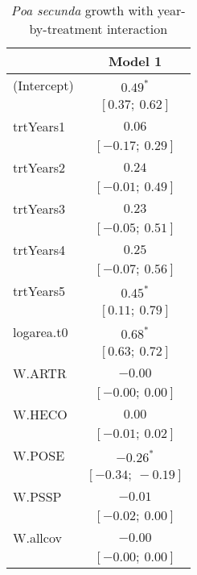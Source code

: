\documentclass[11pt]{article}
\begin{document}
\begin{table}
\caption{\textit{Poa secunda} growth with year-by-treatment interaction}
\begin{center}
\begin{tabular}{l c }
\hline
 & Model 1 \\
\hline
(Intercept)                      & $0.49^{*}$        \\
                                 & $[0.37;\ 0.62]$   \\
trtYears1                        & $0.06$            \\
                                 & $[-0.17;\ 0.29]$  \\
trtYears2                        & $0.24$            \\
                                 & $[-0.01;\ 0.49]$  \\
trtYears3                        & $0.23$            \\
                                 & $[-0.05;\ 0.51]$  \\
trtYears4                        & $0.25$            \\
                                 & $[-0.07;\ 0.56]$  \\
trtYears5                        & $0.45^{*}$        \\
                                 & $[0.11;\ 0.79]$   \\
logarea.t0                       & $0.68^{*}$        \\
                                 & $[0.63;\ 0.72]$   \\
W.ARTR                           & $-0.00$           \\
                                 & $[-0.00;\ 0.00]$  \\
W.HECO                           & $0.00$            \\
                                 & $[-0.01;\ 0.02]$  \\
W.POSE                           & $-0.26^{*}$       \\
                                 & $[-0.34;\ -0.19]$ \\
W.PSSP                           & $-0.01$           \\
                                 & $[-0.02;\ 0.00]$  \\
W.allcov                         & $-0.00$           \\
                                 & $[-0.00;\ 0.00]$  \\

\end{tabular}
\end{center}
\end{table}
\end{document}
